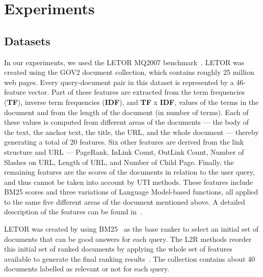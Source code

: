 \documentclass[preprint,review,10pt,3p]{elsarticle}
\begin{document}

\section{Experiments}
\label{experiments}


\subsection{Datasets}
\label{sec:datasets}

In our experiments, we used the LETOR MQ2007 benchmark~\cite{liu2007letor}. LETOR  was  created using  the GOV2 document collection, which contains roughly 25 million web pages.  Every query-document pair in this dataset is represented by a 46-feature vector. Part of these features are extracted from the term frequencies (\textbf{TF}), inverse term frequencies (\textbf{IDF}), and \textbf{TF} x \textbf{IDF}, values of the terms in the document and from the length of the document (in number of terms). Each of these values is computed from different areas of the documents --- the body of the text, the anchor text, the title, the URL, and the whole document --- thereby generating a total of 20 features. Six other features are derived from the link structure and URL --- PageRank, InLink Count, OutLink Count, Number of Slashes on URL, Length of URL, and Number of Child Page. Finally, the remaining features are the scores of the documents in relation to the user query, and thus cannot be taken into account by UTI methods. These features include BM25  scores and three variations of Language Model-based functions, all applied to the same five different areas of the document mentioned above.  A detailed description of the features can be found in~\cite{liu2007letor}. 

LETOR  was created by using BM25~\cite{robertson1994some} as the base ranker to select an initial set of documents that can be good answers for each query. The L2R methods reorder  this initial set of ranked documents by applying the whole set of features available to generate the final ranking results~\cite{cambazoglu2010early}. The collection contains about 40 documents labelled as relevant or not for each query.
\end{document}
